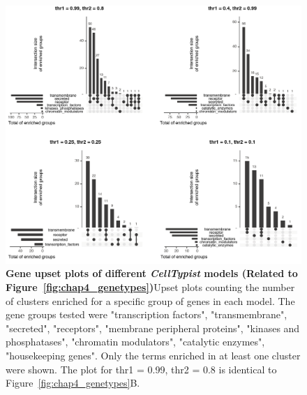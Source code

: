 \begin{figure}[ht!] 
\centering
\includegraphics[scale=0.79]{Appendix2/Figs/appB_upset.png} %
\caption[Gene upset plots of different \textit{CellTypist} models]{\textbf{Gene upset plots of different \textit{CellTypist} models (Related to Figure~\ref{fig:chap4_genetypes})}\newline Upset plots counting the number of clusters enriched for a specific group of genes in each model. The gene groups tested were "transcription factors", "transmembrane", "secreted", "receptors", "membrane peripheral proteins", "kinases and phosphatases", "chromatin modulators", "catalytic enzymes", "housekeeping genes". Only the terms enriched in at least one cluster were shown. The plot for thr1 = 0.99, thr2 = 0.8 is identical to Figure~\ref{fig:chap4_genetypes}B.}
\label{fig:appB_supupset}
\end{figure}


